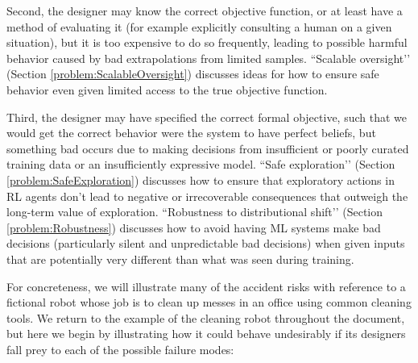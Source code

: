 \documentclass[a4paper,10pt]{article}
\begin{document}
Second, the designer may know the correct objective function, or at least have a method of evaluating it (for example explicitly consulting a human on a given situation), but it is too expensive to do so frequently, leading to possible harmful behavior caused by bad extrapolations from limited samples.  ``Scalable oversight’’ (Section \ref{problem:ScalableOversight}) discusses ideas for how to ensure safe behavior even given limited access to the true objective function.

Third, the designer may have specified the correct formal objective, such that we would get the correct behavior were the system to have perfect beliefs, but something bad occurs due to making decisions from insufficient or poorly curated training data or an insufficiently expressive model.  ``Safe exploration’’ (Section \ref{problem:SafeExploration}) discusses how to ensure that exploratory actions in RL agents don't lead to negative or irrecoverable consequences that outweigh the long-term value of exploration.  ``Robustness to distributional shift’’ (Section \ref{problem:Robustness}) discusses how to avoid having ML systems make bad decisions (particularly silent and unpredictable bad decisions) when given inputs that are potentially very different than what was seen during training.

For concreteness, we will illustrate many of the accident risks with reference to a fictional robot whose job is to clean up messes in an office using common cleaning tools.  We return to the example of the cleaning robot throughout the document, but here we begin by illustrating how it could behave undesirably if its designers fall prey to each of the possible failure modes:
\end{document}
